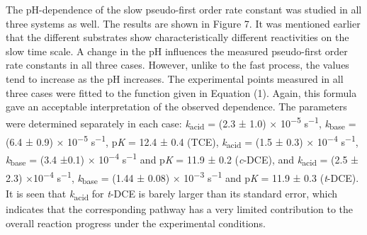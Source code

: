 \documentclass{article}
\begin{document}
The pH-dependence of the slow pseudo-first order rate constant was studied in all three systems as well. The results are shown in Figure 7. It was mentioned earlier that the different substrates show characteristically different reactivities on the slow time scale. A change in the pH influences the measured pseudo-first order rate constants in all three cases. However, unlike to the fast process, the values tend to increase as the pH increases. The experimental points measured in all three cases were fitted to the function given in Equation (1). Again, this formula gave an acceptable interpretation of the observed dependence. The parameters were determined separately in each case: \emph{k}\textsubscript{acid} = (2.3 ± 1.0) × 10\textsuperscript{−5} s\textsuperscript{−1}, \emph{k}\textsubscript{base} = (6.4 ± 0.9) × 10\textsuperscript{−5} s\textsuperscript{−1}, p\emph{K} = 12.4 ± 0.4 (TCE), \emph{k}\textsubscript{acid} = (1.5 ± 0.3) × 10\textsuperscript{−4} s\textsuperscript{−1}, \emph{k}\textsubscript{base} = (3.4 ±0.1) × 10\textsuperscript{−4} s\textsuperscript{−1} and p\emph{K} = 11.9 ± 0.2 (\emph{c}-DCE), and \emph{k}\textsubscript{acid} = (2.5 ± 2.3) ×10\textsuperscript{−4} s\textsuperscript{−1}, \emph{k}\textsubscript{base} = (1.44 ± 0.08) × 10\textsuperscript{−3} s\textsuperscript{−1} and p\emph{K} = 11.9 ± 0.3 (\emph{t}-DCE). It is seen that \emph{k}\textsubscript{acid} for \emph{t}-DCE is barely larger than its standard error, which indicates that the corresponding pathway has a very limited contribution to the overall reaction progress under the experimental conditions.
\end{document}
